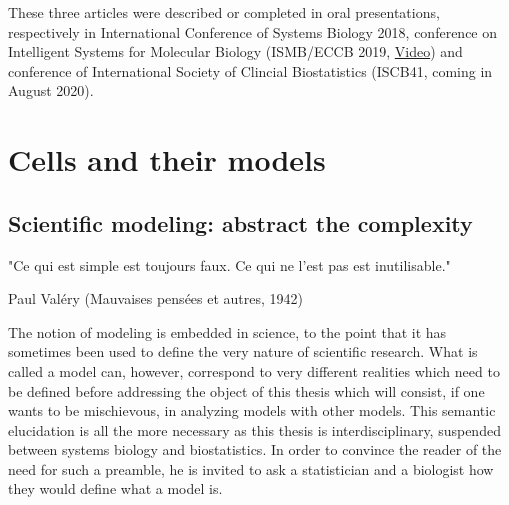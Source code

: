 \documentclass[a4paper,12pt,twoside,onecolumn,openright,final,oldfontcommands]{memoir}
\newcommand{\initial}[1]{
	\lettrine[lines=3,lhang=0.33,nindent=0em]{
		\color{gray}
     		{\textsc{#1}}}{}}
\newcommand\blankpage{%
    \null
    \thispagestyle{empty}%
    \newpage
    }
\newcommand{\clearemptydoublepage}{\newpage{\thispagestyle{empty}\cleardoublepage}}
\begin{document}
These three articles were described or completed in oral presentations,
respectively in International Conference of Systems Biology 2018,
conference on Intelligent Systems for Molecular Biology (ISMB/ECCB 2019,
\href{https://www.youtube.com/watch?v=6EMBycoR0Ow}{Video}) and
conference of International Society of Clincial Biostatistics (ISCB41,
coming in August 2020).

\clearemptydoublepage

\renewcommand{\contentsname}{Table of contents}


\tableofcontents*
{}
\newpage

\listoftables
{}
\newpage

\listoffigures
{}
\newpage

\blankpage


\part{Cells and their
models}\label{part-cells-and-their-models}

\chapter{Scientific modeling: abstract the
complexity}\label{scientific-modeling-abstract-the-complexity}

\epigraph{"Ce qui est simple est toujours faux. Ce qui ne l'est pas est inutilisable."}{Paul Valéry (Mauvaises pensées et autres, 1942)}

\initial{T}he notion of modeling is embedded in science, to the point
that it has sometimes been used to define the very nature of scientific
research. What is called a model can, however, correspond to very
different realities which need to be defined before addressing the
object of this thesis which will consist, if one wants to be
mischievous, in analyzing models with other models. This semantic
elucidation is all the more necessary as this thesis is
interdisciplinary, suspended between systems biology and biostatistics.
In order to convince the reader of the need for such a preamble, he is
invited to ask a statistician and a biologist how they would define what
a model is.
\end{document}
